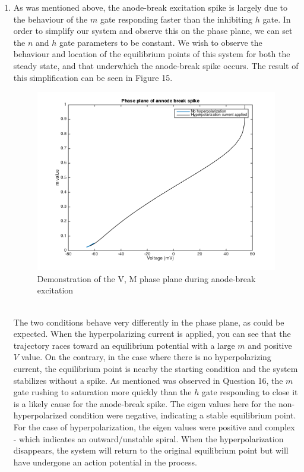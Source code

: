 \documentclass[10pt]{report}
\begin{document}
\begin{enumerate}
\item As was mentioned above, the anode-break excitation spike is largely due to the behaviour of the $m$ gate responding faster than the inhibiting $h$ gate. In order to simplify our system and observe this on the phase plane, we can set the $n$ and $h$ gate parameters to be constant. We wish to observe the behaviour and location of the equilibrium points of this system for both the steady state, and that underwhich the anode-break spike occurs. The result of this simplification can be seen in Figure 15.  \begin{figure}[h!] \includegraphics[scale=0.53]{motnq17.png} \caption[h15]{Demonstration of the V, M phase plane during anode-break excitation} \end{figure} \\ The two conditions behave very differently in the phase plane, as could be expected. When the hyperpolarizing current is applied, you can see that the trajectory races toward an equilibrium potential with a large $m$ and positive $V$ value. On the contrary, in the case where there is no hyperpolarizing current, the equilibrium point is nearby the starting condition and the system stabilizes without a spike. As mentioned was observed in Question 16, the $m$ gate rushing to saturation more quickly than the $h$ gate responding to close it is a likely cause for the anode-break spike. The eigen values here for the non-hyperpolarized condition were negative, indicating a stable equilibrium point. For the case of hyperpolarization, the eigen values were positive and complex - which indicates an outward/unstable spiral. When the hyperpolarization disappears, the system will return to the original equilibrium point but will have undergone an action potential in the process.  

\end{enumerate}
\end{document}
